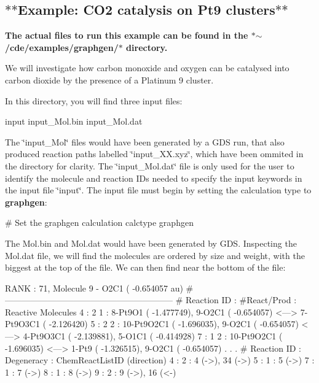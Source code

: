 \subsection*{$\ast$$\ast$\+Example\+: C\+O2 catalysis on Pt9 clusters$\ast$$\ast$}

{\bfseries The actual files to run this example can be found in the $\ast$$\sim$/cde/examples/graphgen/$\ast$ directory.}

We will investigate how carbon monoxide and oxygen can be catalysed into carbon dioxide by the presence of a Platinum 9 cluster.

In this directory, you will find three input files\+: \begin{DoxyVerb}  input
  input_Mol.bin
  input_Mol.dat
\end{DoxyVerb}


The \char`\"{}input\+\_\+\+Mol\char`\"{} files would have been generated by a G\+DS run, that also produced reaction paths labelled \char`\"{}input\+\_\+X\+X.\+xyz\char`\"{}, which have been ommited in the directory for clarity. The \char`\"{}input\+\_\+\+Mol.\+dat\char`\"{} file is only used for the user to identify the molecule and reaction I\+Ds needed to specify the input keywords in the input file \char`\"{}input\char`\"{}. The input file must begin by setting the calculation type to {\bfseries graphgen}\+: \begin{DoxyVerb}#  Set the graphgen calculation
calctype graphgen
\end{DoxyVerb}


The Mol.\+bin and Mol.\+dat would have been generated by G\+DS. Inspecting the Mol.\+dat file, we will find the molecules are ordered by size and weight, with the biggest at the top of the file. We can then find near the bottom of the file\+: \begin{DoxyVerb}RANK :  71, Molecule   9 - O2C1 ( -0.654057 au)
#-----------------------------------------------------------
#          Reaction ID :  #React/Prod  :  Reactive Molecules 
                 4     :      2  1     :    8-Pt9O1 ( -1.477749),    9-O2C1 ( -0.654057)  <--->    7-Pt9O3C1 ( -2.126420)
                 5     :      2  2     :   10-Pt9O2C1 ( -1.696035),    9-O2C1 ( -0.654057)  <--->    4-Pt9O3C1 ( -2.139881),    5-O1C1 ( -0.414928)
                 7     :      1  2     :   10-Pt9O2C1 ( -1.696035)  <--->    1-Pt9 ( -1.326515),    9-O2C1 ( -0.654057)
                                                .
                                                .
                                                .
#          Reaction ID :  Degeneracy   :  ChemReactListID (direction) 
                 4     :      2        :    4 (->),   34 (->)
                 5     :      1        :    5 (->)
                 7     :      1        :    7 (->)
                 8     :      1        :    8 (->)
                 9     :      2        :    9 (->),   16 (<-)
\end{DoxyVerb}


